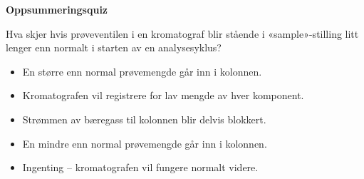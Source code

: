 \vfil \eject

\noindent
{\bf Oppsummeringsquiz}

Hva skjer hvis prøveventilen i en kromatograf blir stående i «sample»-stilling litt lenger enn normalt i starten av en analysesyklus?

\begin{itemize}
\item{} En større enn normal prøvemengde går inn i kolonnen.
\vskip 5pt
\item{} Kromatografen vil registrere for lav mengde av hver komponent.
\vskip 5pt
\item{} Strømmen av bæregass til kolonnen blir delvis blokkert.
\vskip 5pt
\item{} En mindre enn normal prøvemengde går inn i kolonnen.
\vskip 5pt
\item{} Ingenting -- kromatografen vil fungere normalt videre.
\end{itemize}



